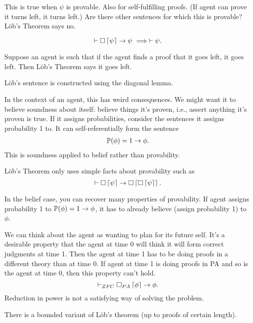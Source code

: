 \documentclass[11pt]{article}
\begin{document}

This is true when $\psi$ is provable. Also for self-fulfilling proofs. (If agent can prove it turns left, it turns left.) %
Are there other sentences for which this is provable? L\"ob's Theorem says no.

\begin{thm}[L\"ob's Theorem]
$$
\vdash \square \left\lceil {\psi}\right\rceil \to \psi \implies \vdash \psi.
$$
\end{thm}

Suppose an agent is such that if the agent finds a proof that it goes left, it goes left. Then L\"ob's Theorem says it goes left.

L\"ob's sentence is constructed using the diagonal lemma.

In the context of an agent, this has weird consequences. We might want it to believe soundness about itself: believe things it's proven, i.e., assert anything it's proven is true. If it assigns probabilities, consider the sentences it assigns probability 1 to. It can self-referentially form the sentence
\begin{align}
\mathbb{P}(\phi)=1\to \phi.
\end{align}
This is soundness applied to belief rather than provability.

L\"ob's Theorem only uses simple facts about provability such as 
$$
\vdash \square \left\lceil {\psi}\right\rceil \to \square \left\lceil {\square \left\lceil {\psi}\right\rceil}\right\rceil.
$$

In the belief case, you can recover many properties of provability. If agent assigns probability 1 to $\mathbb{P}(\phi)=1\to \phi$, it has to already believe (assign probability 1) to $\phi$. 

We can think about the agent as wanting to plan for its future self. It's a desirable property that the agent at time 0 will think it will form correct judgments at time 1. Then the agent at time 1 has to be doing proofs in a different theory than at time 0. If agent at time 1 is doing proofs in PA and so is the agent at time 0, then this property can't hold.
$$
\vdash_{ZFC} \square_{PA} \left\lceil {\phi}\right\rceil\to \phi.
$$
Reduction in power is not a satisfying way of solving the problem.

There is a bounded variant of L\"ob's theorem (up to proofs of certain length).

\end{document}
